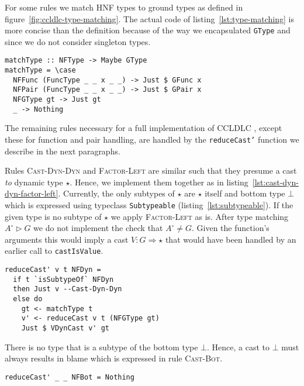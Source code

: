 For some rules we match HNF types to ground types as defined in figure~\ref{fig:ccldlc-type-matching}. The actual code of listing~\ref{lst:type-matching} is more concise than the definition because of the way we encapsulated \texttt{GType} and since we do not consider singleton types.

\begin{lstlisting}[float,
  caption=Haskell: Type matching $A^\circ \rhd G$ (\texttt{Interpreter.hs}),
  label=lst:type-matching]
matchType :: NFType -> Maybe GType
matchType = \case
  NFFunc (FuncType _ _ x _ _) -> Just $ GFunc x
  NFPair (FuncType _ _ x _ _) -> Just $ GPair x
  NFGType gt -> Just gt
  _ -> Nothing
\end{lstlisting}

The remaining rules necessary for a full implementation of CCLDLC , except these for function and pair handling, are handled by the \texttt{reduceCast'} function we describe in the next paragraphs.

Rules \textsc{Cast-Dyn-Dyn} and \textsc{Factor-Left} are similar such that they presume a cast \emph{to} dynamic type $\star$. Hence, we implement them together as in listing~\ref{lst:cast-dyn-dyn-factor-left}. Currently, the only subtypes of $\star$ are $\star$ itself and bottom type $\bot$ which is expressed using typeclass \texttt{Subtypeable} (listing~\ref{lst:subtypeable}). If the given type is no subtype of $\star$ we apply \textsc{Factor-Left} as is. After type matching $A^\circ \rhd G$ we do not implement the check that $A^\circ \neq G$. Given the function's arguments this would imply a cast $V : G \Rightarrow \star$ that would have been handled by an earlier call to \texttt{castIsValue}.

\begin{lstlisting}[float,
  label=lst:cast-dyn-dyn-factor-left,
  caption=Haskell: Rules \textsc{Cast-Dyn-Dyn} and \\ \textsc{Factor-Left} (\texttt{Interpreter.hs})]
reduceCast' v t NFDyn =
  if t `isSubtypeOf` NFDyn
  then Just v --Cast-Dyn-Dyn
  else do
    gt <- matchType t
    v' <- reduceCast v t (NFGType gt)
    Just $ VDynCast v' gt
\end{lstlisting}

There is no type that is a subtype of the bottom type $\bot$. Hence, a cast to $\bot$ must always results in blame which is expressed in rule \textsc{Cast-Bot}.

\begin{lstlisting}[caption=Haskell: Rule \textsc{Cast-Bot} (\texttt{Interpreter.hs})]
reduceCast' _ _ NFBot = Nothing
\end{lstlisting}

